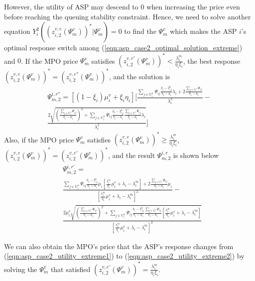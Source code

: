\documentclass[10pt,journal, compsoc]{IEEEtran}
\begin{document}
However, the utility of ASP may descend to $0$ when increasing the price even before reaching the queuing stability constraint. Hence, we need to solve another equation $Y_i^2((z_{i,2}^{v,e}(\Psi_m^v))^*|\Psi_m^v) = 0$ to find the $\Psi_m^v$ which makes the ASP $i$'s optimal response switch among (\ref{eqn:asp_case2_optimal_solution_extreme}) and $0$.
If the MPO price $\Psi_m^v$ satisfies $(z_{i,2}^{v,e'}(\Psi_m^v))^* < \frac{\lambda_i^m}{\eta_i\xi_i}$, the best response $(z_{i,2}^{v,e}(\Psi_m^v))^* = (z_{i,2}^{v,e''}(\Psi_m^v))^*$, and the solution is
\begin{multline}
\Psi_{m,2}^{i,r''} = [(1-\xi_i)\mu_i^v + \xi_i \eta_i]\big[\frac{\sum_{j \in \mathrm{U}_i^n}\Psi_{ij}\frac{b_i-T_{ij}^t }{b_i-a_i}\lambda_i+2\frac{\sum_{j \in \mathrm{U}_i^n}\Psi_{ij}}{b_i-a_i}}{\lambda_i^2}-\\
\frac{2\sqrt{(\frac{\sum_{j \in \mathrm{U}_i^n}\Psi_{ij}}{b_i-a_i})^2+\sum_{j \in \mathrm{U}_i^n}\Psi_{ij}\frac{b_i-T_{ij}^t}{b_i-a_i}\frac{\sum_{j \in \mathrm{U}_i^n}\Psi_{ij}}{b_i-a_i}\lambda_i}}{\lambda_i^2}\big]
\end{multline}
Also, if the MPO price $\Psi_m^v$ satisfies $(z_{i,2}^{v,e}(\Psi_m^v))^* \geq \frac{\lambda_i^m}{\eta_i\xi_i}$, $(z_{i,2}^{v,e}(\Psi_m^v))^* = (z_{i,2}^{v,e'}(\Psi_m^v))^*$, and the result $\Psi_{m,2}^{i,r}$ is shown below
\begin{equation}
    \begin{aligned}
    &\Psi_{m,2}^{i,r'} =\\ & \frac{\sum\limits_{j \in \mathrm{U}_i^n}\Psi_{ij}\frac{b_i-T_{ij}^t }{b_i-a_i}\mu_i[\frac{\lambda_i^m}{\eta_i}\mu_i^v+\lambda_i-\lambda_i^m]+2\frac{\sum_{j \in \mathrm{U}_i^n}\Psi_{ij}}{b_i-a_i}\mu_i}{[\frac{\lambda_i^m}{\eta_i}\mu_i^v+\lambda_i-\lambda_i^m]^2}- \\
&\frac{2\mu_i^v\sqrt{(\frac{\sum\limits_{j \in \mathrm{U}_i^n}\Psi_{ij}}{b_i-a_i})^2+\sum\limits_{j \in \mathrm{U}_i^n}\Psi_{ij}\frac{b_i-T_{ij}^t}{b_i-a_i}\frac{\sum\limits_{j \in \mathrm{U}_i^n}\Psi_{ij}}{b_i-a_i}[\frac{\lambda^m_i}{\eta_i}\mu_i^v+\lambda_i-\lambda_i^m]}}{[\frac{\lambda_i^m}{\eta_i}\mu_i^v+\lambda_i-\lambda_i^m]^2}
\end{aligned}
\end{equation}



We can also obtain the MPO's price that the ASP's response changes from (\ref{eqn:asp_case2_utility_extreme1}) to (\ref{eqn:asp_case2_utility_extreme2}) by solving the $\Psi^v_m$ that satisfied $(z_{i,2}^{v,e'}(\Psi_m^v))^* = \frac{\lambda_i^m}{\eta_i \xi_i}$.
\end{document}
